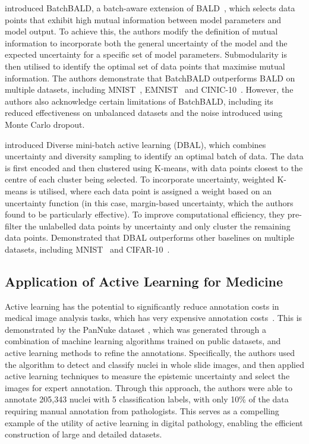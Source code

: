 \cite{kirsch2019batchbald} introduced BatchBALD, a batch-aware extension of BALD~\citep{gal2017deep}, which selects data points that exhibit high mutual information between model parameters and model output. To achieve this, the authors modify the definition of mutual information to incorporate both the general uncertainty of the model and the expected uncertainty for a specific set of model parameters. Submodularity is then utilised to identify the optimal set of data points that maximise mutual information. The authors demonstrate that BatchBALD outperforms BALD on multiple datasets, including MNIST~\citep{lecun1998gradient}, EMNIST~\citep{cohen2017emnist} and CINIC-10~\citep{darlow2018cinic}. However, the authors also acknowledge certain limitations of BatchBALD, including its reduced effectiveness on unbalanced datasets and the noise introduced using Monte Carlo dropout.

\cite{zhdanov2019diverse} introduced Diverse mini-batch active learning (DBAL), which combines uncertainty and diversity sampling to identify an optimal batch of data. The data is first encoded and then clustered using K-means, with data points closest to the centre of each cluster being selected. To incorporate uncertainty, weighted K-means is utilised, where each data point is assigned a weight based on an uncertainty function (in this case, margin-based uncertainty, which the authors found to be particularly effective). To improve computational efficiency, they pre-filter the unlabelled data points by uncertainty and only cluster the remaining data points. Demonstrated that DBAL outperforms other baselines on multiple datasets, including MNIST~\citep{lecun1998gradient} and CIFAR-10~\citep{krizhevsky2009learning}.

\subsection{Application of Active Learning for Medicine}
\label{subsec:active_applications}
Active learning has the potential to significantly reduce annotation costs in medical image analysis tasks, which has very expensive annotation costs~\citep{budd2021survey}. This is demonstrated by the PanNuke dataset \citep{gamper2019pannuke, gamper2020pannuke}, which was generated through a combination of machine learning algorithms trained on public datasets, and active learning methods to refine the annotations. Specifically, the authors used the algorithm to detect and classify nuclei in whole slide images, and then applied active learning techniques to measure the epistemic uncertainty and select the images for expert annotation. Through this approach, the authors were able to annotate 205,343 nuclei with 5 classification labels, with only 10\% of the data requiring manual annotation from pathologists. This serves as a compelling example of the utility of active learning in digital pathology, enabling the efficient construction of large and detailed datasets.

